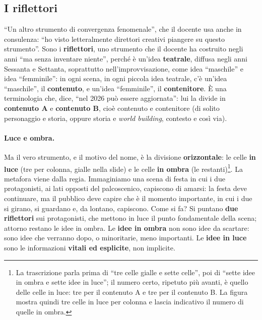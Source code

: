 \subsection{I riflettori}



``Un altro strumento di convergenza fenomenale'', che il docente usa anche in consulenza:
``ho visto letteralmente direttori creativi piangere su questo strumento''. Sono i
\textbf{riflettori}, uno strumento che il docente ha costruito negli anni ``ma senza
inventare niente'', perché è un'idea \textbf{teatrale}, diffusa negli anni Sessanta e
Settanta, soprattutto nell'improvvisazione, come idea ``maschile'' e idea ``femminile'':
in ogni scena, in ogni piccola idea teatrale, c'è un'idea ``maschile'', il
\textbf{contenuto}, e un'idea ``femminile'', il \textbf{contenitore}. È una terminologia
che, dice, ``nel 2026 può essere aggiornata'': lui la divide in \textbf{contenuto A} e
\textbf{contenuto B}, cioè contenuto e contenitore (di solito personaggio e storia, oppure
storia e \emph{world building}, contesto e così via).

\paragraph{Luce e ombra.} Ma il vero strumento, e il motivo del nome, è la divisione
\textbf{orizzontale}: le celle \textbf{in luce} (tre per colonna, gialle nella slide) e le
celle \textbf{in ombra} (le restanti)\footnote{La trascrizione parla prima di ``tre celle
gialle e sette celle'', poi di ``sette idee in ombra e sette idee in luce''; il numero
certo, ripetuto più avanti, è quello delle celle in luce: tre per il contenuto A e tre per
il contenuto B. La figura mostra quindi tre celle in luce per colonna e lascia indicativo il
numero di quelle in ombra.}. La metafora viene dalla regia. Immaginiamo una scena di festa
in cui i due protagonisti, ai lati opposti del palcoscenico, capiscono di amarsi: la festa
deve continuare, ma il pubblico deve capire che è il momento importante, in cui i due si
girano, si guardano e, da lontano, capiscono. Come si fa? Si puntano \textbf{due
riflettori} sui protagonisti, che mettono in luce il punto fondamentale della scena;
attorno restano le idee in ombra. Le \textbf{idee in ombra} non sono idee da scartare:
sono idee che verranno dopo, o minoritarie, meno importanti. Le \textbf{idee in luce} sono
le informazioni \textbf{vitali ed esplicite}, non implicite.

